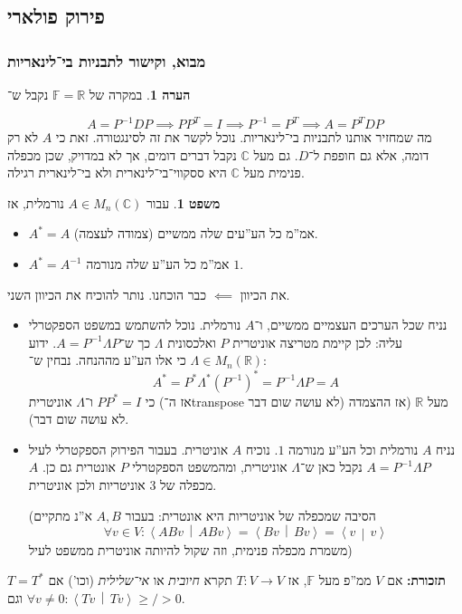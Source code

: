 \documentclass[a4paper]{article}
\newcommand\R     {\mathbb{R}}
\newcommand\C     {\mathbb{C}}
\newcommand\ra    {\rangle}
\newcommand\la    {\langle}
\newcommand\F         {\mathbb{F}}
\newcommand\co        {\colon}
\newcommand\mut [2]   {\left \la #1 \,\middle\vert\, #2 \right \ra}
\newcommand\Lg        {\Lambda}
\newcommand\op    {^{-1}}
\theoremstyle{definition}
\newtheorem{Theorem}{\color{myblue}משפט}
\newtheorem{Remark}{\color{mycyan}הערה}
\newcommand\theo  [1] {\begin{Theorem}#1\end{Theorem}}
\newcommand\rmark [1] {\begin{Remark}#1\end{Remark}}
\begin{document}
	\subsection{פירוק פולארי}
	\subsubsection{מבוא, וקישור לתבניות בי־לינאריות}
	\rmark{במקרה של $\F= \R$ נקבל ש־}
	\[ A = P\op DP \implies PP^T = I \implies P\op = P^T \implies A = P^TDP \]
	מה שמחזיר אותנו לתבניות בי־לינאריות. נוכל לקשר את זה לסינגטורה. זאת כי $A$ לא רק דומה, אלא גם חופפת ל־$D$. גם מעל $\C$ נקבל דברים דומים, אך לא במדויק, שכן מכפלה פנימית מעל $\C$ היא ססקווי־בי־לינארית ולא בי־לינארית רגילה. 
	
	\theo{עבור $A \in M_n(\C)$ נורמלית, אז
		\begin{itemize}
			\item $A^* = A$ (צמודה לעצמה) אמ''מ כל הע''עים שלה ממשיים. 
			\item $A^* = A\op$ אמ''מ כל הע''ע שלה מנורמה $1$. 
	\end{itemize}}
	את הכיוון $\impliedby$ כבר הוכחנו. נותר להוכיח את הכיוון השני. 
	\begin{itemize}
		\item נניח שכל הערכים העצמיים ממשיים, ו־$A$ נורמלית. נוכל להשתמש במשפט הספקטרלי עליה: לכן קיימת מטריצה אוניטרית $P$ ואלכסונית $\Lg$ כך ש־$A = P\op \Lg P$. ידוע $\Lg \in M_n(\R)$ כי אלו הע''ע מההנחה. נבחין ש־: 
		\[ A^* = P^* \Lg^* (P\op)^* = P\op \Lg P = A \]
		כי $PP^* =I$ ו־$\Lg$ אוניטרית (אז ה־transpose לא עושה שום דבר) מעל $\R$ (אז ההצמדה לא עושה שום דבר). 
		\item נניח $A$ נורמלית וכל הע''ע מנורמה $1$. נוכיח $A$ אוניטרית. בעבור הפירוק הספקטרלי לעיל $A = P\op \Lg P$ נקבל כאן ש־$\Lg$ אוניטרית, ומהמשפט הספקטרלי $P$ אונטרית גם כן. $A$ מכפלה של 3 אוניטריות ולכן אוניטרית. 
		
		(הסיבה שמכפלה של אוניטריות היא אונטרית: בעבור $A, B$ א''נ מתקיים
		\[ \forall v \in V \co \mut{ABv}{ABv} = \mut{Bv}{Bv} = \mut{v}{v} \]
		משמרת מכפלה פנימית, וזה שקול להיותה אוניטרית ממשפט לעיל)
	\end{itemize}
	
	\textbf{תזכורת: }אם $V$ ממ''פ מעל $\F$, אז $T \co V \to V$ תקרא \textit{חיובית} או \textit{אי־שלילית} (וכו') אם $T = T^*$ וגם $\forall v \neq 0 \co \mut{Tv}{Tv} \ge\!/\!> 0$. 
	
\end{document}
